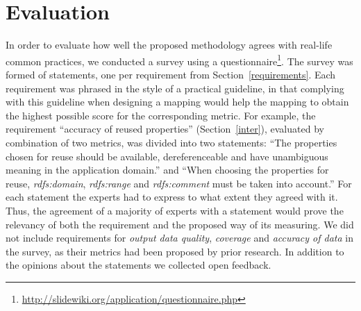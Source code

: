 \section{Evaluation}
\label{evaluation}
In order to evaluate how well the proposed methodology agrees with real-life common practices, we  conducted a survey using a questionnaire\footnote{\url{http://slidewiki.org/application/questionnaire.php}}.
The survey was formed of statements, one per requirement from Section~\ref{requirements}.
Each requirement was phrased in the style of a practical guideline, in that complying with this guideline when designing a mapping would help the mapping to obtain the highest possible score for the corresponding metric.
For example, the requirement ``accuracy of reused properties'' (Section~\ref{inter}), evaluated by combination of two metrics, was divided into two statements: ``The properties chosen for reuse should be available, dereferenceable and have unambiguous meaning in the application domain.'' and ``When choosing the properties for reuse, \textit{rdfs:domain}, \textit{rdfs:range} and \textit{rdfs:comment} must be taken into account.''
For each statement the experts had to express to what extent they agreed with it.
Thus, the agreement of a majority of experts with a statement would prove the relevancy of both the requirement and the proposed way of its measuring.
We did not include requirements for \emph{output data quality}, \emph{coverage} and \emph{accuracy of data} in the survey, as their metrics had been proposed by prior research. 
In addition to the opinions about the statements we collected open feedback.

